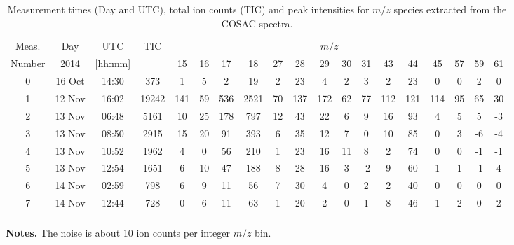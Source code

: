 \documentclass{aa}
\begin{document}
\begin{table*}
\tiny
   \centering
      \caption{Measurement times (Day and UTC), total ion counts (TIC) and peak intensities for $m/z$ species extracted from 
      the COSAC  spectra. }
   \begin{tabular}{@{} ccccccccccccccccccc @{}} 
   \hline    
   \hline
Meas.     &    Day     &   UTC &   TIC & \multicolumn{14}{c}{$m/z$} \\
Number    &   2014     & [hh:mm] &       & 15 & 16 &  17 &   18 & 27 & 28 & 29 & 30 & 31 & 43 & 44 & 45 & 57 & 59 & 61 \\
\hline
      0       & 16 Oct & 14:30 &  373  &  1 &  5 &   2 &   19 &  2 & 23 & 4  &  2 &  3 &  2 & 23 &  0 &  0 &  2 &  0  \\
      1       & 12 Nov & 16:02 & 19242 & 141& 59 & 536 & 2521 & 70 & 137& 172& 62 & 77 & 112& 121&114 & 95 & 65 & 30 \\
      2       & 13 Nov & 06:48 & 5161  &  10& 25 & 178 & 797  & 12 & 43 & 22 & 6  & 9  & 16 & 93 & 4  & 5  & 5  & -3 \\
      3       & 13 Nov & 08:50 & 2915  &  15& 20 & 91  & 393  &  6 &  35& 12 & 7  & 0  & 10 & 85 & 0  & 3  & -6 & -4 \\
      4       & 13 Nov & 10:52 & 1962  &   4&  0 & 56  &  210 &  1 & 23 & 16 & 11 & 8  &  2 &  74& 0  &  0 & -1 & -1  \\
      5       & 13 Nov & 12:54 & 1651  &   6& 10 & 47  & 188  &  8 & 28 & 16 & 3  & -2 &  9 & 60 & 1  & 1  & -1 &  4  \\
      6       & 14 Nov & 02:59 & 798   &   6&  9  &11  & 56   &  7 & 30 &  4 & 0  & 2  &  2 & 40 & 0  & 0  & 0  &  0  \\
      7       & 14 Nov & 12:44 & 728   &   0 & 6  & 11 & 63   &  1 & 20 & 2  & 0  & 1  &  8 & 46 & 1  & 2  &  0 &  2 \\
      \hline
      &  &  &    &    &   &  &    &   &  &   &   &   &   &  &   &   &   &   \\
         \end{tabular}
         
        {\bf Notes.}  The noise is about 10 ion counts per integer $m/z$ bin.
   \label{tab_1}
\end{table*}
\end{document}
